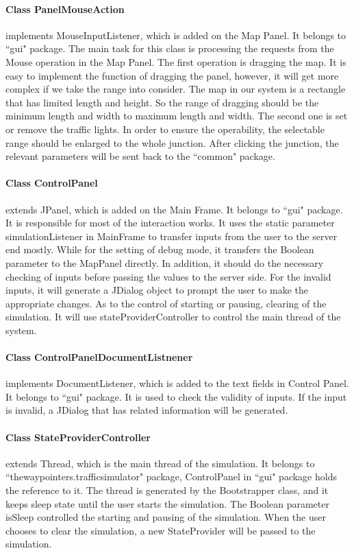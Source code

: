 \documentclass[a4paper,12pt]{article}
\begin{document}
\paragraph{Class PanelMouseAction} implements MouseInputListener, which is added on the Map Panel. It belongs to ``gui" package. The main task for this class is processing the requests from the Mouse operation in the Map Panel. The first operation is dragging the map. It is easy to implement the function of dragging the panel, however, it will get more complex if we take the range into consider. The map in our system is a rectangle that has limited length and height. So the range of dragging should be the minimum length and width to maximum length and width. The second one is set or remove the traffic lights. In order to ensure the operability, the selectable range should be enlarged to the whole junction. After clicking the junction, the relevant parameters will be sent back to the ``common" package.
\paragraph{Class ControlPanel} extends JPanel, which is added on the Main Frame. It belongs to ``gui" package. It is responsible for most of the interaction works. It uses the static parameter simulationListener in MainFrame to transfer inputs from the user to the server end mostly. While for the setting of debug mode, it transfers the Boolean parameter to the MapPanel directly. In addition, it should do the necessary checking of inputs before passing the values to the server side. For the invalid inputs, it will generate a JDialog object to prompt the user to make the appropriate changes. As to the control of starting or pausing, clearing of the simulation. It will use stateProviderController to control the main thread of the system.
\paragraph{Class ControlPanelDocumentListnener} implements DocumentListener, which is added to the text fields in Control Panel. It belongs to ``gui" package. It is used to check the validity of inputs. If the input is invalid, a JDialog that has related information will be generated.
\paragraph{Class StateProviderController} extends Thread, which is the main thread of the simulation. It belongs to ``thewaypointers.trafficsimulator" package, ControlPanel in ``gui" package holds the reference to it. The thread is generated by the Bootstrapper class, and it keeps sleep state until the user starts the simulation. The Boolean parameter isSleep controlled the starting and pausing of the simulation. When the user chooses to clear the simulation, a new StateProvider will be passed to the simulation.
\end{document}
